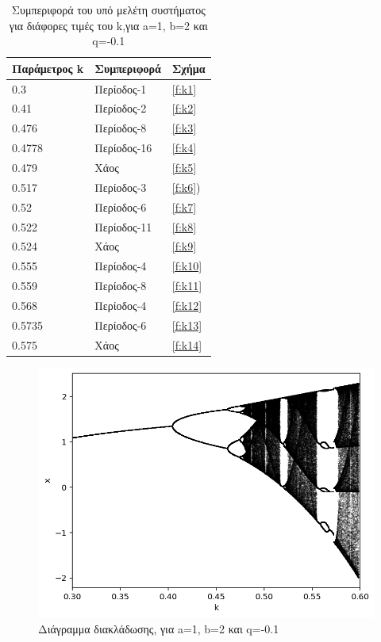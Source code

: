 \begin{table}[h!]
	\centering
	\begin{tabular}{l | l | l}
		Παράμετρος k & Συμπεριφορά & Σχήμα\\
		\hline
		0.3 &  Περίοδος-1 & \ref{f:k1}\\
		0.41 & Περίοδος-2 & \ref{f:k2}\\
		0.476 &  Περίοδος-8 & \ref{f:k3}\\
		0.4778 & Περίοδος-16 & \ref{f:k4}\\
		0.479 & Χάος & \ref{f:k5}\\
		0.517 & Περίοδος-3 & \ref{f:k6})\\
		0.52 & Περίοδος-6 & \ref{f:k7}\\
		0.522 & Περίοδος-11 & \ref{f:k8}\\
		0.524 & Χάος & \ref{f:k9}\\
		0.555 & Περίοδος-4 & \ref{f:k10}\\
		0.559 & Περίοδος-8 & \ref{f:k11}\\
		0.568 & Περίοδος-4 & \ref{f:k12}\\
		0.5735 & Περίοδος-6 & \ref{f:k13}\\
		0.575 & Χάος & \ref{f:k14}\\
	\end{tabular}
	\caption{ Συμπεριφορά του υπό μελέτη συστήματος για διάφορες τιμές του k,για a=1, b=2 και q=-0.1}
	\label{tab:abc}
\end{table}


\begin{figure}[h!]
	\centering
	\includegraphics[width=0.6\linewidth]{LateX images/graphs/g1}
	\caption{ Διάγραμμα διακλάδωσης, για a=1, b=2 και q=-0.1}
	\label{f:g1}
\end{figure}



